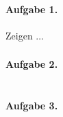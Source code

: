 \paragraph*{Aufgabe 1.} Zeigen $\dots$
$$
	\phantom{...}
$$
\paragraph*{Aufgabe 2.}
$$
\phantom{...}
$$
\paragraph*{Aufgabe 3.}